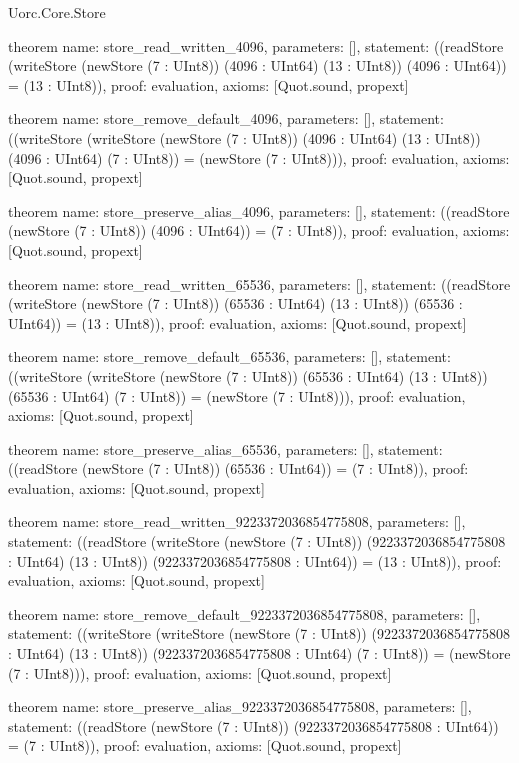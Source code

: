 \begin{lexlean}{Uorc.Core.Store}
\begin{semanticmodule}
theorem{
  name: store_read_written_4096,
  parameters: [],
  statement: ((readStore (writeStore (newStore (7 : UInt8)) (4096 : UInt64) (13 : UInt8)) (4096 : UInt64)) = (13 : UInt8)),
  proof: evaluation{},
  axioms: [Quot.sound, propext]
}

theorem{
  name: store_remove_default_4096,
  parameters: [],
  statement: ((writeStore (writeStore (newStore (7 : UInt8)) (4096 : UInt64) (13 : UInt8)) (4096 : UInt64) (7 : UInt8)) = (newStore (7 : UInt8))),
  proof: evaluation{},
  axioms: [Quot.sound, propext]
}

theorem{
  name: store_preserve_alias_4096,
  parameters: [],
  statement: ((readStore (newStore (7 : UInt8)) (4096 : UInt64)) = (7 : UInt8)),
  proof: evaluation{},
  axioms: [Quot.sound, propext]
}

theorem{
  name: store_read_written_65536,
  parameters: [],
  statement: ((readStore (writeStore (newStore (7 : UInt8)) (65536 : UInt64) (13 : UInt8)) (65536 : UInt64)) = (13 : UInt8)),
  proof: evaluation{},
  axioms: [Quot.sound, propext]
}

theorem{
  name: store_remove_default_65536,
  parameters: [],
  statement: ((writeStore (writeStore (newStore (7 : UInt8)) (65536 : UInt64) (13 : UInt8)) (65536 : UInt64) (7 : UInt8)) = (newStore (7 : UInt8))),
  proof: evaluation{},
  axioms: [Quot.sound, propext]
}

theorem{
  name: store_preserve_alias_65536,
  parameters: [],
  statement: ((readStore (newStore (7 : UInt8)) (65536 : UInt64)) = (7 : UInt8)),
  proof: evaluation{},
  axioms: [Quot.sound, propext]
}

theorem{
  name: store_read_written_9223372036854775808,
  parameters: [],
  statement: ((readStore (writeStore (newStore (7 : UInt8)) (9223372036854775808 : UInt64) (13 : UInt8)) (9223372036854775808 : UInt64)) = (13 : UInt8)),
  proof: evaluation{},
  axioms: [Quot.sound, propext]
}

theorem{
  name: store_remove_default_9223372036854775808,
  parameters: [],
  statement: ((writeStore (writeStore (newStore (7 : UInt8)) (9223372036854775808 : UInt64) (13 : UInt8)) (9223372036854775808 : UInt64) (7 : UInt8)) = (newStore (7 : UInt8))),
  proof: evaluation{},
  axioms: [Quot.sound, propext]
}

theorem{
  name: store_preserve_alias_9223372036854775808,
  parameters: [],
  statement: ((readStore (newStore (7 : UInt8)) (9223372036854775808 : UInt64)) = (7 : UInt8)),
  proof: evaluation{},
  axioms: [Quot.sound, propext]
}


\end{semanticmodule}
\end{lexlean}

